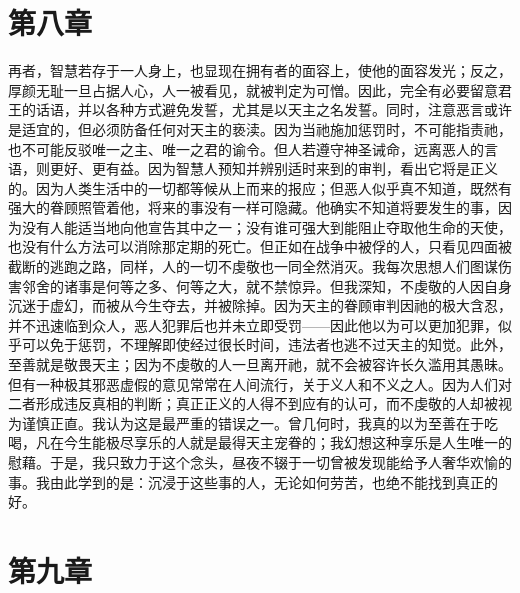 
\section{第八章}

再者，智慧若存于一人身上，也显现在拥有者的面容上，使他的面容发光；反之，厚颜无耻一旦占据人心，人一被看见，就被判定为可憎。因此，完全有必要留意君王的话语，并以各种方式避免发誓，尤其是以天主之名发誓。同时，注意恶言或许是适宜的，但必须防备任何对天主的亵渎。因为当祂施加惩罚时，不可能指责祂，也不可能反驳唯一之主、唯一之君的谕令。但人若遵守神圣诫命，远离恶人的言语，则更好、更有益。因为智慧人预知并辨别适时来到的审判，看出它将是正义的。因为人类生活中的一切都等候从上而来的报应；但恶人似乎真不知道，既然有强大的眷顾照管着他，将来的事没有一样可隐藏。他确实不知道将要发生的事，因为没有人能适当地向他宣告其中之一；没有谁可强大到能阻止夺取他生命的天使，也没有什么方法可以消除那定期的死亡。但正如在战争中被俘的人，只看见四面被截断的逃跑之路，同样，人的一切不虔敬也一同全然消灭。我每次思想人们图谋伤害邻舍的诸事是何等之多、何等之大，就不禁惊异。但我深知，不虔敬的人因自身沉迷于虚幻，而被从今生夺去，并被除掉。因为天主的眷顾审判因祂的极大含忍，并不迅速临到众人，恶人犯罪后也并未立即受罚——因此他以为可以更加犯罪，似乎可以免于惩罚，不理解即使经过很长时间，违法者也逃不过天主的知觉。此外，至善就是敬畏天主；因为不虔敬的人一旦离开祂，就不会被容许长久滥用其愚昧。但有一种极其邪恶虚假的意见常常在人间流行，关于义人和不义之人。因为人们对二者形成违反真相的判断；真正正义的人得不到应有的认可，而不虔敬的人却被视为谨慎正直。我认为这是最严重的错误之一。曾几何时，我真的以为至善在于吃喝，凡在今生能极尽享乐的人就是最得天主宠眷的；我幻想这种享乐是人生唯一的慰藉。于是，我只致力于这个念头，昼夜不辍于一切曾被发现能给予人奢华欢愉的事。我由此学到的是：沉浸于这些事的人，无论如何劳苦，也绝不能找到真正的好。\par


\section{第九章}

